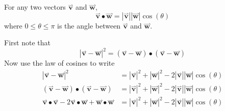 \documentclass{ximera}
\begin{document}
\begin{theorem}
  For any two vectors $\overset{\boldsymbol{\rightharpoonup}}{\mathbf{v}}$ and $\overset{\boldsymbol{\rightharpoonup}}{\mathbf{w}}$,
  \[
  \overset{\boldsymbol{\rightharpoonup}}{\mathbf{v}} \bullet \overset{\boldsymbol{\rightharpoonup}}{\mathbf{w}} = |\overset{\boldsymbol{\rightharpoonup}}{\mathbf{v}}||\overset{\boldsymbol{\rightharpoonup}}{\mathbf{w}}|\cos(\theta)
  \]
  where $0\le \theta\le\pi$ is the angle between $\overset{\boldsymbol{\rightharpoonup}}{\mathbf{v}}$ and
  $\overset{\boldsymbol{\rightharpoonup}}{\mathbf{w}}$.
  \begin{explanation}
    First note that
    \[
    |\overset{\boldsymbol{\rightharpoonup}}{\mathbf{v}} - \overset{\boldsymbol{\rightharpoonup}}{\mathbf{w}}|^2 =  (\overset{\boldsymbol{\rightharpoonup}}{\mathbf{v}} - \overset{\boldsymbol{\rightharpoonup}}{\mathbf{w}})\bullet(\overset{\boldsymbol{\rightharpoonup}}{\mathbf{v}} - \overset{\boldsymbol{\rightharpoonup}}{\mathbf{w}})
    \]
    Now use the law of cosines to write
    \begin{align*}
      |\overset{\boldsymbol{\rightharpoonup}}{\mathbf{v}} - \overset{\boldsymbol{\rightharpoonup}}{\mathbf{w}}|^2&=|\overset{\boldsymbol{\rightharpoonup}}{\mathbf{v}}|^2+|\overset{\boldsymbol{\rightharpoonup}}{\mathbf{w}}|^2-2|\overset{\boldsymbol{\rightharpoonup}}{\mathbf{v}}||\overset{\boldsymbol{\rightharpoonup}}{\mathbf{w}}|\cos(\theta)\\
      (\overset{\boldsymbol{\rightharpoonup}}{\mathbf{v}} - \overset{\boldsymbol{\rightharpoonup}}{\mathbf{w}})\bullet(\overset{\boldsymbol{\rightharpoonup}}{\mathbf{v}} - \overset{\boldsymbol{\rightharpoonup}}{\mathbf{w}}) &=|\overset{\boldsymbol{\rightharpoonup}}{\mathbf{v}}|^2+|\overset{\boldsymbol{\rightharpoonup}}{\mathbf{w}}|^2-2|\overset{\boldsymbol{\rightharpoonup}}{\mathbf{v}}||\overset{\boldsymbol{\rightharpoonup}}{\mathbf{w}}|\cos(\theta)\\
      \overset{\boldsymbol{\rightharpoonup}}{\mathbf{v}}\bullet\overset{\boldsymbol{\rightharpoonup}}{\mathbf{v}} -2\overset{\boldsymbol{\rightharpoonup}}{\mathbf{v}}\bullet\overset{\boldsymbol{\rightharpoonup}}{\mathbf{w}}+\overset{\boldsymbol{\rightharpoonup}}{\mathbf{w}}\bullet\overset{\boldsymbol{\rightharpoonup}}{\mathbf{w}}&=|\overset{\boldsymbol{\rightharpoonup}}{\mathbf{v}}|^2+|\overset{\boldsymbol{\rightharpoonup}}{\mathbf{w}}|^2-2|\overset{\boldsymbol{\rightharpoonup}}{\mathbf{v}}||\overset{\boldsymbol{\rightharpoonup}}{\mathbf{w}}|\cos(\theta)\\

\end{align*}
\end{explanation}
\end{theorem}
\end{document}
